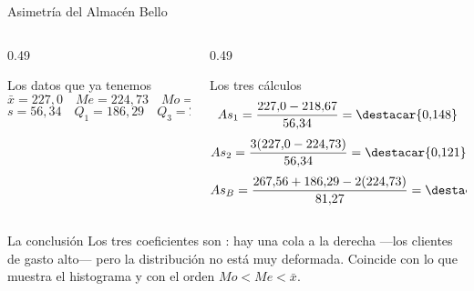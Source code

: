 \documentclass[aspectratio=169,10pt]{beamer}
\begin{document}
\begin{frame}{Asimetría del Almacén Bello}
  \scriptsize
  \begin{columns}[T,onlytextwidth]
    \begin{column}{0.49\textwidth}
      \begin{exampleblock}{Los datos que ya tenemos}
        \scriptsize
        \[ \bar{x}=227{,}0 \quad Me=224{,}73 \quad Mo=218{,}67 \]
        \[ s = 56{,}34 \quad Q_1=186{,}29 \quad Q_3=267{,}56 \]
      \end{exampleblock}
    \end{column}
    \begin{column}{0.49\textwidth}
      \begin{block}{Los tres cálculos}
        \scriptsize
        \[ As_1 = \frac{227{,}0-218{,}67}{56{,}34} = \destacar{0{,}148} \]
        \[ As_2 = \frac{3(227{,}0-224{,}73)}{56{,}34} = \destacar{0{,}121} \]
        \[ As_B = \frac{267{,}56+186{,}29-2(224{,}73)}{81{,}27}
                = \destacar{0{,}054} \]
      \end{block}
    \end{column}
  \end{columns}

  \vspace{0.1cm}
  \begin{alertblock}{La conclusión}
    \scriptsize
    Los tres coeficientes son : hay una cola
    a la derecha —los clientes de gasto alto— pero la distribución no está muy
    deformada. Coincide con lo que muestra el histograma y con el orden
    $Mo < Me < \bar{x}$.
  \end{alertblock}
\end{frame}
\end{document}
